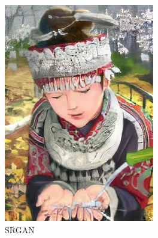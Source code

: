 \documentclass[12pt,a4paper]{article}
\begin{document}
\begin{figure}[H]
\begin{subfigure}{0.2\textwidth}
                \includegraphics[width=\textwidth]{images/samples/img-4-srgan.png}
                \caption*{SRGAN}
            \end{subfigure}
            \enspace
            \begin{subfigure}{0.2\textwidth}

\end{subfigure}
\end{figure}
\end{document}
